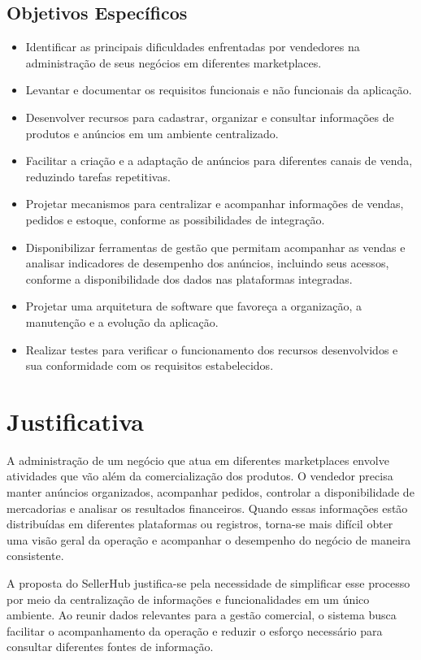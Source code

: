 \subsection{Objetivos Específicos}

\begin{itemize}
    \item Identificar as principais dificuldades enfrentadas por vendedores na administração de seus negócios em diferentes marketplaces.
    \item Levantar e documentar os requisitos funcionais e não funcionais da aplicação.
    \item Desenvolver recursos para cadastrar, organizar e consultar informações de produtos e anúncios em um ambiente centralizado.
    \item Facilitar a criação e a adaptação de anúncios para diferentes canais de venda, reduzindo tarefas repetitivas.
    \item Projetar mecanismos para centralizar e acompanhar informações de vendas, pedidos e estoque, conforme as possibilidades de integração.
    \item Disponibilizar ferramentas de gestão que permitam acompanhar as vendas e analisar indicadores de desempenho dos anúncios, incluindo seus acessos, conforme a disponibilidade dos dados nas plataformas integradas.
    \item Projetar uma arquitetura de software que favoreça a organização, a manutenção e a evolução da aplicação.
    \item Realizar testes para verificar o funcionamento dos recursos desenvolvidos e sua conformidade com os requisitos estabelecidos.
\end{itemize}

\section{Justificativa}

A administração de um negócio que atua em diferentes marketplaces envolve atividades que vão além da comercialização dos produtos. O vendedor precisa manter anúncios organizados, acompanhar pedidos, controlar a disponibilidade de mercadorias e analisar os resultados financeiros. Quando essas informações estão distribuídas em diferentes plataformas ou registros, torna-se mais difícil obter uma visão geral da operação e acompanhar o desempenho do negócio de maneira consistente.

A proposta do SellerHub justifica-se pela necessidade de simplificar esse processo por meio da centralização de informações e funcionalidades em um único ambiente. Ao reunir dados relevantes para a gestão comercial, o sistema busca facilitar o acompanhamento da operação e reduzir o esforço necessário para consultar diferentes fontes de informação.


